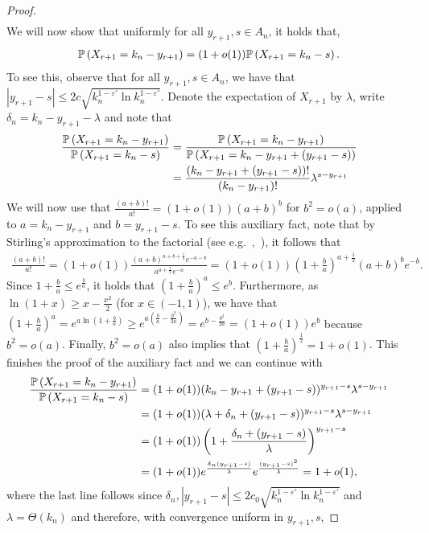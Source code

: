\begin{proof}
\begin{align*}
\end{align*}
We will now show that uniformly for all $y_{r+1}, s \in A_n$, it holds that,
\begin{align}\label{eq:yrp1tos}
	\mathbb{P}\left(X_{r+1}=k_n-y_{r+1}\right) = (1+o(1))\mathbb{P}\left(X_{r+1}=k_n-s\right).
\end{align}
To see this, observe that for all $y_{r+1},s\in A_n$, we have that $|y_{r+1}-s|\leq 2c\sqrt{k_n^{1-\varepsilon'}\ln k_n^{1-\varepsilon'}}$. Denote the expectation of $X_{r+1}$ by $\lambda$, write $\delta_n = k_n-y_{r+1}-\lambda$ and note that
\begin{align*}
	\frac{\mathbb{P}\left(X_{r+1}=k_n-y_{r+1}\right)}{\mathbb{P}\left(X_{r+1}=k_n-s\right)} 
	&= \frac{\mathbb{P}\left(X_{r+1}=k_n-y_{r+1}\right)}{\mathbb{P}\left(X_{r+1}=k_n-y_{r+1}+(y_{r+1}-s)\right)}\\
	&=\frac{(k_n-y_{r+1}+(y_{r+1}-s))!}{(k_n-y_{r+1})!}\lambda^{s-y_{r+1}}
\end{align*}
We will now use that $\frac{(a+b)!}{a!} = (1+o(1))(a+b)^b$ for $b^2=o(a)$, applied to $a=k_n-y_{r+1}$ and $b=y_{r+1}-s$. To see this auxiliary fact, note that by Stirling's approximation to the factorial (see e.g.~\cite{Dutkay2013},~\cite{Nanjundiah1959}), it follows that
\begin{align*}
	\frac{(a+b)!}{a!}=(1+o(1))\frac{(a+b)^{a+b+\frac{1}{2}}e^{-a-b}}{a^{a+\frac{1}{2}}e^{-a}}
	=(1+o(1))\left(1+\frac{b}{a}\right)^{a+\frac{1}{2}}(a+b)^b e^{-b}.
\end{align*}
Since $1+\frac{b}{a}\leq e^{\frac{b}{a}}$, it holds that $(1+\frac{b}{a})^a \leq e^b$. Furthermore, as $\ln(1+x)\geq x-\frac{x^2}{2}$ (for $x\in (-1,1)$), we have that $(1+\frac{b}{a})^a =e^{a\ln(1+\frac{b}{a})}\geq e^{a(\frac{b}{a}-\frac{b^2}{2a})} =e^{b-\frac{b^2}{2a}}=(1+o(1))e^{b}$ because $b^2=o(a)$. Finally, $b^2=o(a)$ also implies that $(1+\frac{b}{a})^\frac{1}{2}=1+o(1)$. This finishes the proof of the auxiliary fact and we can continue with
\begin{align*}
	\frac{\mathbb{P}\left(X_{r+1}=k_n-y_{r+1}\right)}{\mathbb{P}\left(X_{r+1}=k_n-s\right)}
	&=(1+o(1)) (k_n-y_{r+1}+(y_{r+1}-s))^{y_{r+1}-s} \lambda^{s-y_{r+1}} \\
	&=(1+o(1)) (\lambda+\delta_n+(y_{r+1}-s))^{y_{r+1}-s} \lambda^{s-y_{r+1}} \\
	&=(1+o(1))\left(1+\frac{\delta_n+(y_{r+1}-s)}{\lambda}\right)^{y_{r+1}-s} \\
	&=(1+o(1)) e^{\frac{\delta_n(y_{r+1}-s)}{\lambda}} e^{\frac{(y_{r+1}-s)^2}{\lambda}} = 1+o(1),
\end{align*}
where the last line follows since $\delta_n, |y_{r+1}-s| \leq 2c_0\sqrt{k_n^{1-\varepsilon'}\ln k_n^{1-\varepsilon'}}$ and $\lambda=\Theta(k_n)$ and therefore, with convergence uniform in $y_{r+1},s$,

\end{proof}
